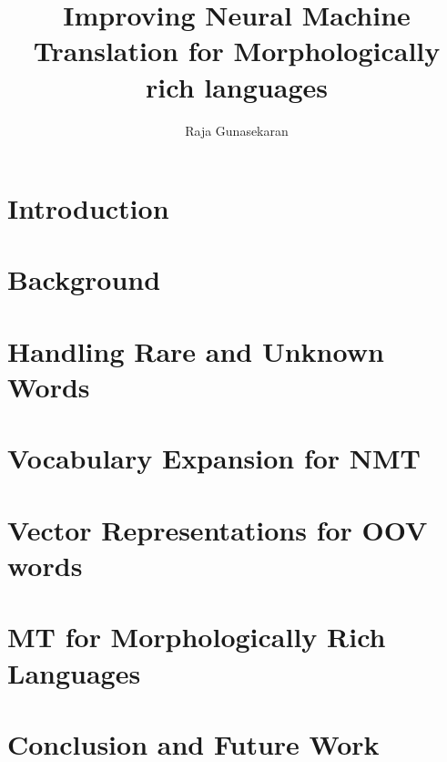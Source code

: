\documentclass[12pt]{report}
\title{Improving Neural Machine Translation for Morphologically rich languages }
\author{Raja Gunasekaran}
\begin{document}

	
%
\pagestyle{plain}
\clearpage

\tableofcontents
\listoftables
\listoffigures
\newpage
{}



\chapter{Introduction}


\chapter{Background}
\label{background}


\chapter{Handling Rare and Unknown Words}
\label{related}


\chapter{Vocabulary Expansion for NMT}
\label{proposed}



\chapter{Vector Representations for OOV words}
\label{comparision1}


\chapter{MT for Morphologically Rich Languages}
\label{experiments}


\chapter{Conclusion and Future Work}
\label{conclusion}

\end{document}
